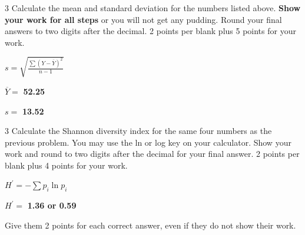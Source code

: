 \showpoints


\question[9]
\begin{multicols*}{3}
Calculate the mean and standard deviation for the numbers listed above.
\textbf{Show your work for all steps} or you will not get any pudding. Round your final answers to two digits after the decimal.
2 points per blank plus 5 points for your work. 

\columnbreak

\hfil $ s = \sqrt{\frac{\sum{(Y-\overline{Y})^2}}{n-1}} $ \hfill


\columnbreak

$\overline{Y}=$ \ifprintanswers \textbf{52.25} \else \AnswerBlank \fi

\vspace*{2\baselineskip}

$s = $ \ifprintanswers \textbf{13.52} \else \AnswerBlank \fi


\end{multicols*}

\question[6]
\begin{multicols}{3}
Calculate the Shannon diversity index for the same four numbers as the previous problem.
You may use the ln or log key on your calculator. 
Show your work and round to two digits after the decimal for your final answer. 
2 points per blank plus 4 points for your work. 


\columnbreak

\hfil $ H^\prime = -\sum{p_i \ln p_i} $ \hfill

\columnbreak

$H^\prime=$ \ifprintanswers \textbf{1.36 or 0.59} \else \AnswerBlank \fi


\end{multicols}

\begin{solution}

Give them 2 points for each correct answer, even if they do not show their work. 

\end{solution}